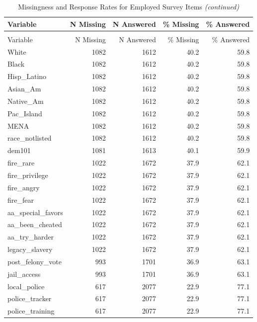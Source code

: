 \begingroup\fontsize{9}{11}\selectfont

\begin{longtable}[t]{lrrrr}
\caption{\label{tab:tab:used_var_missingness}Missingness and Response Rates for Employed Survey Items}\\
\toprule
Variable & N Missing & N Answered & \% Missing & \% Answered\\
\midrule
\endfirsthead
\caption[]{Missingness and Response Rates for Employed Survey Items \textit{(continued)}}\\
\toprule
Variable & N Missing & N Answered & \% Missing & \% Answered\\
\midrule
\endhead

\endfoot
\bottomrule
\endlastfoot
White & 1082 & 1612 & 40.2 & 59.8\\
Black & 1082 & 1612 & 40.2 & 59.8\\
Hisp\_Latino & 1082 & 1612 & 40.2 & 59.8\\
Asian\_Am & 1082 & 1612 & 40.2 & 59.8\\
Native\_Am & 1082 & 1612 & 40.2 & 59.8\\
\addlinespace
Pac\_Island & 1082 & 1612 & 40.2 & 59.8\\
MENA & 1082 & 1612 & 40.2 & 59.8\\
race\_notlisted & 1082 & 1612 & 40.2 & 59.8\\
dem101 & 1081 & 1613 & 40.1 & 59.9\\
fire\_rare & 1022 & 1672 & 37.9 & 62.1\\
\addlinespace
fire\_privilege & 1022 & 1672 & 37.9 & 62.1\\
fire\_angry & 1022 & 1672 & 37.9 & 62.1\\
fire\_fear & 1022 & 1672 & 37.9 & 62.1\\
aa\_special\_favors & 1022 & 1672 & 37.9 & 62.1\\
aa\_been\_cheated & 1022 & 1672 & 37.9 & 62.1\\
\addlinespace
aa\_try\_harder & 1022 & 1672 & 37.9 & 62.1\\
legacy\_slavery & 1022 & 1672 & 37.9 & 62.1\\
post\_felony\_vote & 993 & 1701 & 36.9 & 63.1\\
jail\_access & 993 & 1701 & 36.9 & 63.1\\
local\_police & 617 & 2077 & 22.9 & 77.1\\
\addlinespace
police\_tracker & 617 & 2077 & 22.9 & 77.1\\
police\_training & 617 & 2077 & 22.9 & 77.1\\

\end{longtable}
